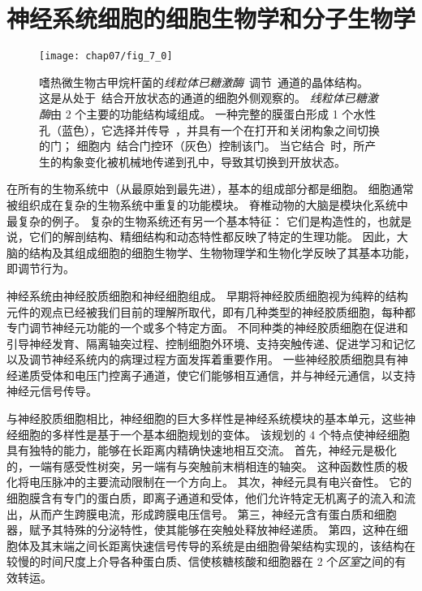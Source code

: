 \part{神经系统细胞的细胞生物学和分子生物学}

\begin{figure}[htbp]
	\centering
	\texttt{[image: chap07/fig\_7\_0]}
	\caption{嗜热微生物古甲烷杆菌的\textit{线粒体已糖激酶}~调节~通道的晶体结构。
		这是从处于~结合开放状态的通道的细胞外侧观察的。
		\textit{线粒体已糖激酶}由 2 个主要的功能结构域组成。
		一种完整的膜蛋白形成 1 个水性孔（蓝色），它选择并传导~，并具有一个在打开和关闭构象之间切换的门；
		细胞内~结合门控环（灰色）控制该门。
		当它结合~时，所产生的构象变化被机械地传递到孔中，导致其切换到开放状态。}
	\label{fig:7_0}
\end{figure}





在所有的生物系统中（从最原始到最先进），基本的组成部分都是细胞。
细胞通常被组织成在复杂的生物系统中重复的功能模块。
脊椎动物的大脑是模块化系统中最复杂的例子。
复杂的生物系统还有另一个基本特征：
它们是构造性的，也就是说，它们的解剖结构、精细结构和动态特性都反映了特定的生理功能。
因此，大脑的结构及其组成细胞的细胞生物学、生物物理学和生物化学反映了其基本功能，即调节行为。


神经系统由神经胶质细胞和神经细胞组成。
早期将神经胶质细胞视为纯粹的结构元件的观点已经被我们目前的理解所取代，即有几种类型的神经胶质细胞，每种都专门调节神经元功能的一个或多个特定方面。
不同种类的神经胶质细胞在促进和引导神经发育、隔离轴突过程、控制细胞外环境、支持突触传递、促进学习和记忆以及调节神经系统内的病理过程方面发挥着重要作用。
一些神经胶质细胞具有神经递质受体和电压门控离子通道，使它们能够相互通信，并与神经元通信，以支持神经元信号传导。


与神经胶质细胞相比，神经细胞的巨大多样性是神经系统模块的基本单元，这些神经细胞的多样性是基于一个基本细胞规划的变体。
该规划的 4 个特点使神经细胞具有独特的能力，能够在长距离内精确快速地相互交流。
首先，神经元是极化的，一端有感受性树突，另一端有与突触前末梢相连的轴突。
这种函数性质的极化将电压脉冲的主要流动限制在一个方向上。
其次，神经元具有电兴奋性。
它的细胞膜含有专门的蛋白质，即离子通道和受体，他们允许特定无机离子的流入和流出，从而产生跨膜电流，形成跨膜电压信号。
第三，神经元含有蛋白质和细胞器，赋予其特殊的分泌特性，使其能够在突触处释放神经递质。
第四，这种在细胞体及其末端之间长距离快速信号传导的系统是由细胞骨架结构实现的，该结构在较慢的时间尺度上介导各种蛋白质、信使核糖核酸和细胞器在 2 个\textit{区室}之间的有效转运。


